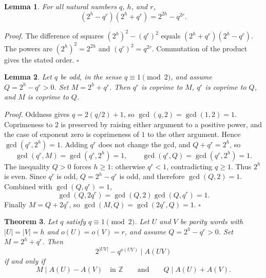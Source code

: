 \documentclass[11pt,letterpaper]{article}
\newcommand{\Z}{\mathbb{Z}}
\newtheorem{theorem}{Theorem}
\newtheorem{lemma}[theorem]{Lemma}
\newenvironment{proof}{\noindent\textit{Proof.}}{\hfill\(\square\)}
\begin{document}
\begin{lemma}
\label{lem:det}
For all natural numbers \(q\), \(h\), and \(r\),
\[
(2^h-q^r)(2^h+q^r)=2^{2h}-q^{2r}.
\]
\end{lemma}

\begin{proof}
The difference of squares \((2^h)^2-(q^r)^2\) equals \((2^h+q^r)(2^h-q^r)\). The powers are \((2^h)^2=2^{2h}\) and \((q^r)^2=q^{2r}\). Commutation of the product gives the stated order.
\end{proof}

\begin{lemma}
\label{lem:coprime}
Let \(q\) be odd, in the sense \(q\equiv 1\pmod{2}\), and assume \(Q=2^h-q^r>0\). Set \(M=2^h+q^r\). Then \(q^r\) is coprime to \(M\), \(q^r\) is coprime to \(Q\), and \(M\) is coprime to \(Q\).
\end{lemma}

\begin{proof}
Oddness gives \(q=2(q/2)+1\), so \(\gcd(q,2)=\gcd(1,2)=1\). Coprimeness to \(2\) is preserved by raising either argument to a positive power, and the case of exponent zero is coprimeness of \(1\) to the other argument. Hence \(\gcd(q^r,2^h)=1\). Adding \(q^r\) does not change the gcd, and \(Q+q^r=2^h\), so
\[
\gcd(q^r,M)=\gcd(q^r,2^h)=1,\qquad \gcd(q^r,Q)=\gcd(q^r,2^h)=1.
\]
The inequality \(Q>0\) forces \(h\ge 1\): otherwise \(q^r<1\), contradicting \(q\ge 1\). Thus \(2^h\) is even. Since \(q^r\) is odd, \(Q=2^h-q^r\) is odd, and therefore \(\gcd(Q,2)=1\). Combined with \(\gcd(Q,q^r)=1\),
\[
\gcd(Q,2q^r)=\gcd(Q,2)\gcd(Q,q^r)=1.
\]
Finally \(M=Q+2q^r\), so \(\gcd(M,Q)=\gcd(2q^r,Q)=1\).
\end{proof}

\begin{theorem}
\label{thm:equal-halves}
Let \(q\) satisfy \(q\equiv 1\pmod{2}\). Let \(U\) and \(V\) be parity words with \(|U|=|V|=h\) and \(o(U)=o(V)=r\), and assume \(Q=2^h-q^r>0\). Set \(M=2^h+q^r\). Then
\[
2^{|UV|}-q^{o(UV)}\mid A(UV)
\]
if and only if
\[
M\mid A(U)-A(V)\quad\text{in }\Z
\qquad\text{and}\qquad
Q\mid A(U)+A(V).
\]
\end{theorem}
\end{document}
